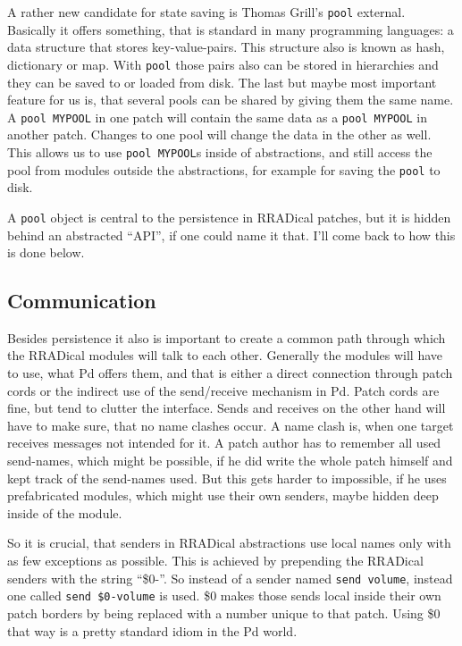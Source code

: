 \documentclass[10pt,english]{scrartcl}
\begin{document}
A rather new candidate for state saving is Thomas Grill's \texttt{pool} external.
Basically it offers something, that is standard in many programming
languages: a data structure that stores key-value-pairs. This structure also
is known as hash, dictionary or map. With \texttt{pool} those pairs also can be
stored in hierarchies and they can be saved to or loaded from disk. The last
but maybe most important feature for us is, that several pools can be shared
by giving them the same name. A \texttt{pool MYPOOL} in one patch will contain
the same data as a \texttt{pool MYPOOL} in another patch. Changes to one pool
will change the data in the other as well. This allows us to use \texttt{pool
MYPOOL}s inside of abstractions, and still access the pool from modules
outside the abstractions, for example for saving the \texttt{pool} to disk.

A \texttt{pool} object is central to the persistence in RRADical patches, but it
is hidden behind an abstracted ``API'', if one could name it that. I'll
come back to how this is done below.



\hypertarget{communication}{}
\subsection*{Communication}

Besides persistence it also is important to create a common path through
which the RRADical modules will talk to each other. Generally the modules
will have to use, what Pd offers them, and that is either a direct
connection through patch cords or the indirect use of the send/receive
mechanism in Pd. Patch cords are fine, but tend to clutter the interface.
Sends and receives on the other hand will have to make sure, that no name
clashes occur. A name clash is, when one target receives messages not
intended for it. A patch author has to remember all used send-names, which
might be possible, if he did write the whole patch himself and kept track of
the send-names used.  But this gets harder to impossible, if he uses
prefabricated modules, which might use their own senders, maybe hidden deep
inside of the module.

So it is crucial, that senders in RRADical abstractions use local names only
with as few exceptions as possible. This is achieved by prepending the
RRADical senders with the string ``{\$}0-''. So instead of a sender named \texttt{send
volume}, instead one called \texttt{send {\$}0-volume} is used. {\$}0 makes those
sends local inside their own patch borders by being replaced with a number
unique to that patch. Using {\$}0 that way is a pretty standard idiom in the Pd
world.
\end{document}
